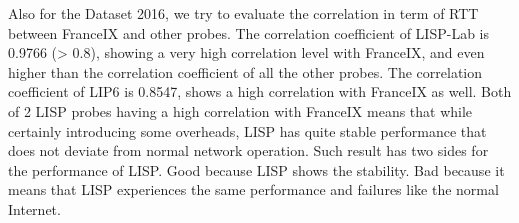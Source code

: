 Also for the Dataset 2016, we try to evaluate the correlation in term of RTT between FranceIX and other probes. %
The correlation coefficient of LISP-Lab is 0.9766 (> 0.8), showing a very high correlation level with FranceIX, and even higher than the correlation coefficient of all the other probes. The correlation coefficient of LIP6 is 0.8547, shows a high correlation with FranceIX as well. Both of 2 LISP probes having a high correlation with FranceIX means that while certainly introducing some overheads, LISP has quite stable performance that does not deviate from normal network operation. Such result has two sides for the performance of LISP. Good because LISP shows the stability. Bad because it means that LISP experiences the same performance and failures like the normal Internet.

